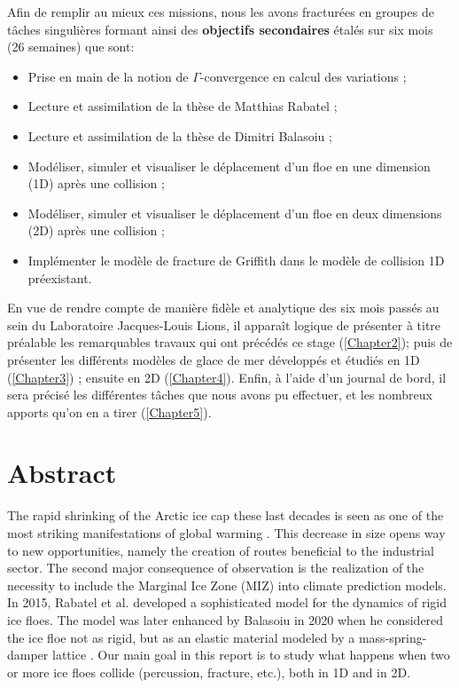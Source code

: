 \noindent Afin de remplir au mieux ces missions, nous les avons fracturées en groupes de tâches singulières formant ainsi des \textbf{objectifs secondaires} étalés sur six mois (26 semaines) que sont:   

\begin{itemize}
    \item Prise en main de la notion de $\Gamma$-convergence en calcul des variations ;
    \item Lecture et assimilation de la thèse de Matthias Rabatel \parencite{rabatel2015thesis} ;
    \item Lecture et assimilation de la thèse de Dimitri Balasoiu \parencite{balasoiu2020halthesis} ;
    \item Modéliser, simuler et visualiser le déplacement d'un floe en une dimension (1D) après une collision ;
    \item Modéliser, simuler et visualiser le déplacement d'un floe en deux dimensions (2D) après une collision ;
    \item Implémenter le modèle de fracture de Griffith dans le modèle de collision 1D préexistant.
\end{itemize}



En vue de rendre compte de manière fidèle et analytique des six mois passés au sein du Laboratoire Jacques-Louis Lions, il apparaît logique de présenter à titre préalable les remarquables travaux qui ont précédés ce stage (\cref{Chapter2}); puis de présenter les différents modèles de glace de mer développés et étudiés en 1D (\cref{Chapter3}) ; ensuite en 2D (\cref{Chapter4}). Enfin, à l'aide d'un journal de bord, il sera précisé les différentes tâches que nous avons pu effectuer, et les nombreux apports qu'on en a tirer (\cref{Chapter5}). 









\section{Abstract}


The rapid shrinking of the Arctic ice cap these last decades is seen as one of the most striking manifestations of global warming \parencite{stroeve2012trends}. This decrease in size opens way to new opportunities, namely the creation of routes beneficial to the industrial sector. The second major consequence of observation is the realization of the necessity to include the Marginal Ice Zone (MIZ) into climate prediction models. In 2015, Rabatel et al. \parencite{rabatel2015dynamics,rabatel2015thesis} developed a sophisticated model for the dynamics of rigid ice floes. The model was later enhanced by Balasoiu in 2020 when he considered the ice floe not as rigid, but as an elastic material modeled by a mass-spring-damper lattice \parencite{balasoiu2020halthesis}. Our main goal in this report is to study what happens when two or more ice floes collide (percussion, fracture, etc.), both in 1D and in 2D.
